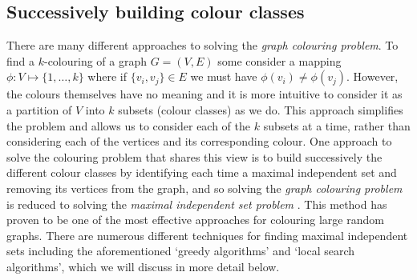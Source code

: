 \documentclass[12pt,a4paper]{article}
\begin{document}
\subsection*{Successively building colour classes}
There are many different approaches to solving the \textit{graph colouring problem}. To find a $k$-colouring of a graph $G=(V,E)$ some consider a mapping $\phi : V \mapsto \{1,\dots, k\}$ where if $\{v_i, v_j\} \in E$ we must have $\phi(v_i) \neq \phi(v_j)$. However, the colours themselves have no meaning and it is more intuitive to consider it as a partition of $V$ into $k$ subsets (colour classes) as we do. This approach simplifies the problem and allows us to consider each of the $k$ subsets at a time, rather than considering each of the vertices and its corresponding colour. One approach to solve the colouring problem that shares this view is to build successively the different colour classes by identifying each time a maximal independent set and removing its vertices from the graph, and so solving the \textit{graph colouring problem} is reduced to solving the \textit{maximal independent set problem} \cite{Hao}. This method has proven to be one of the most effective approaches for colouring large random graphs. There are numerous different techniques for finding maximal independent sets \cite{Tarjan} including the aforementioned `greedy algorithms' and  `local search algorithms', which we will discuss in more detail below.
\end{document}

